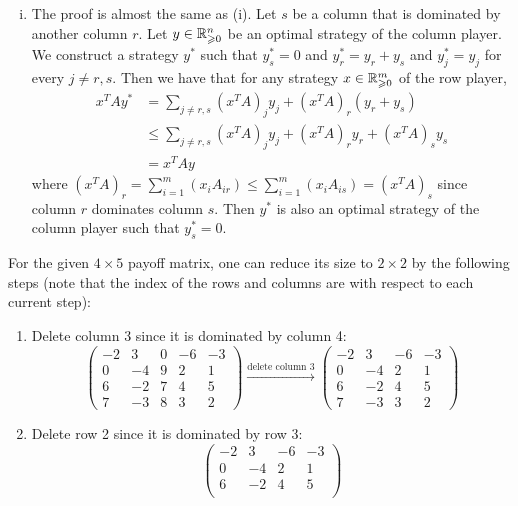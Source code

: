 \documentclass[11pt]{article}
\renewcommand{\leq}{\leqslant}
\renewcommand{\geq}{\geqslant}
\begin{document}
\begin{enumerate}[1)]
\begin{solution}
\begin{enumerate}[(i)]
\item The proof is almost the same as (i). Let $s$ be a column that is dominated by another column $r$. Let $y\in \R^{n}_{\geq 0}$ be an optimal strategy of the column player. 
We construct a strategy $y^\ast$ such that $y^\ast_s = 0$ and $y^\ast_r = y_r + y_s$ and $y^\ast_j = y_j$ for every $j \neq r, s$. Then we have that for any strategy $x\in \R^{m}_{\geq 0}$ of the row player,
\begin{align*}
x^T A y^\ast & = \sum_{j \neq r, s} (x^T A)_j y_j + (x^T A)_r (y_r + y_s) \\
& \leq \sum_{j \neq r, s} (x^T A)_j y_j + (x^T A)_r y_r + (x^T A)_s y_s \\
& = x^T A y
\end{align*}
where $(x^T A)_r = \sum_{i=1}^m (x_i A_{ir}) \leq \sum_{i=1}^m (x_i A_{is}) = (x^T A)_s$ since column $r$ dominates column $s$. 
Then $y^\ast$ is also an optimal strategy of the column player such that $y^\ast_s = 0$.
\end{enumerate}
For the given $4\times 5$ payoff matrix, one can reduce its size to $2\times 2$ by the following steps (note that the index of the rows and columns are with respect to each current step):
\begin{enumerate}[1.]
  \item Delete column 3 since it is dominated by column 4:
  \begin{equation*}
  \begin{pmatrix}
    -2 & 3 & 0 & -6 & -3 \\
    0 & -4 & 9 & 2 & 1 \\
    6 & -2 & 7 & 4 & 5 \\
    7 & -3 & 8 & 3 & 2 
  \end{pmatrix} \xrightarrow{\text{delete column 3}}
  \begin{pmatrix}
    -2 & 3 & -6 & -3 \\
    0 & -4 & 2 & 1 \\
    6 & -2 & 4 & 5 \\
    7 & -3 & 3 & 2 
  \end{pmatrix}
  \end{equation*}
  \item Delete row 2 since it is dominated by row 3:
  \begin{equation*}
  \begin{pmatrix}
    -2 & 3 & -6 & -3 \\
    0 & -4 & 2 & 1 \\
    6 & -2 & 4 & 5 \\   

\end{pmatrix}
\end{equation*}
\end{enumerate}
\end{solution}
\end{enumerate}
\end{document}
